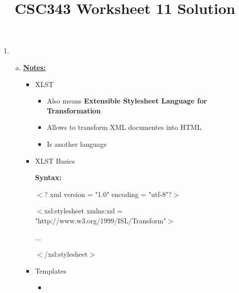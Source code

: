 \documentclass[12pt]{article}
\begin{document}
\title{CSC343 Worksheet 11 Solution}
\maketitle

\begin{enumerate}[1.]
    \item

    \begin{enumerate}[a)]
        \item

        \bigskip

        \underline{\textbf{Notes:}}

        \bigskip

        \begin{itemize}
            \item XLST
            \begin{itemize}
                \item Also means \textbf{Extensible Stylesheet Language for Transformation}
                \item Allows to transform XML documentes into HTML
                \item Is another language
            \end{itemize}
            \item XLST Basics

            \bigskip

            \textbf{Syntax:}

            \bigskip

            $<$? xml version = "1.0" encoding = "utf-8"?$>$

            $<$xsl:stylesheet xmlns:xsl = "http://www.w3.org/1999/ISL/Transform"$>$

            \quad...

            $<$/xsl:stylesheet$>$


            \item Templates
            \begin{itemize}
                \item
            \end{itemize}
        \end{itemize}
    \end{enumerate}
\end{enumerate}
\end{document}
